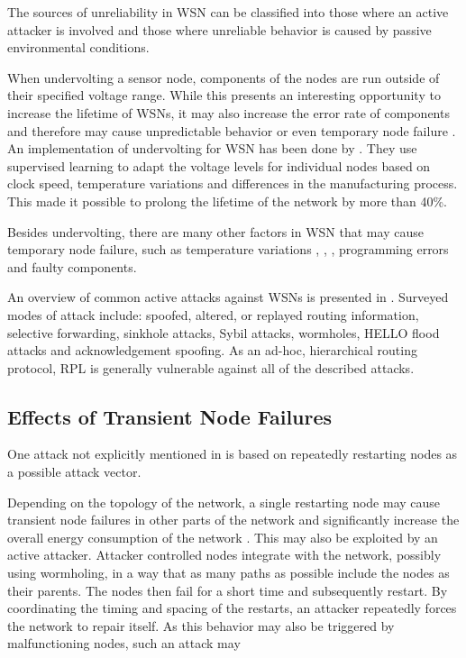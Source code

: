 \documentclass[
  a4paper,
  11pt,
  style=screen,
  extramargin,
  bcor=10mm,
  rgb,
  hyperrefdark,
  abstract=off,
  lnum,
]{tubsartcl}
\begin{document}
The sources of unreliability in \ac{WSN} can be classified into those where an active attacker is involved and those where unreliable behavior is caused by passive environmental conditions.

When undervolting a sensor node, components of the nodes are run outside of their specified voltage range.
While this presents an interesting opportunity to increase the lifetime of \acp{WSN}, it may also increase the error rate of components and therefore may cause unpredictable behavior or even temporary node failure \cite{kulau2015undervolting}.
An implementation of undervolting for \ac{WSN} has been done by \cite{kulau2016idealvolting}.
They use supervised learning to adapt the voltage levels for individual nodes based on clock speed, temperature variations and differences in the manufacturing process.
This made it possible to prolong the lifetime of the network by more than 40\%.

Besides undervolting, there are many other factors in \ac{WSN} that may cause temporary node failure, such as temperature variations \cite{boano2010impact}, \cite{boano2013hot}, \cite{reynolds1974thermally}, programming errors and faulty components.

An overview of common active attacks against \acp{WSN} is presented in \cite{karlof2003secure}.
Surveyed modes of attack include: spoofed, altered, or replayed routing information, selective forwarding, sinkhole attacks, Sybil attacks, wormholes, HELLO flood attacks and acknowledgement spoofing.
As an ad-hoc, hierarchical routing protocol, \ac{RPL} is generally vulnerable against all of the described attacks.

\subsection{Effects of Transient Node Failures}

One attack not explicitly mentioned in \cite{karlof2003secure} is based on repeatedly restarting nodes as a possible attack vector.

Depending on the topology of the network, a single restarting node may cause transient node failures in other parts of the network and significantly increase the overall energy consumption of the network \cite{kulau2017energy}.
This may also be exploited by an active attacker.
Attacker controlled nodes integrate with the network, possibly using wormholing, in a way that as many paths as possible include the nodes as their parents.
The nodes then fail for a short time and subsequently restart.
By coordinating the timing and spacing of the restarts, an attacker repeatedly forces the network to repair itself.
As this behavior may also be triggered by malfunctioning nodes, such an attack may 
\end{document}
